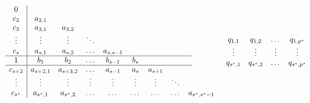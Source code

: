 \documentclass[../document.tex]{subfiles}
\begin{document}
                \begin{equation}
                    \begin{array}{c|ccccccccc}
                        0 & \multicolumn{9}{c}{}\\
                        c_2 & a_{2,1} & \multicolumn{8}{c}{}\\
                        c_3 & a_{3,1} & a_{3,2} & \multicolumn{7}{c}{}\\
                        \vdots & \vdots & \vdots & \ddots & \multicolumn{6}{c}{}\\
                        c_s & a_{s,1} & a_{s,2} & \dots & a_{s,s-1} & \multicolumn{5}{c}{}\\
                        \hline
                        1 & b_1 & b_2 & \dots & b_{s-1} & b_s & \multicolumn{4}{c}{}\\
                        \hline
                        c_{s+2} & a_{s+2,1} & a_{s+3,2} & \dots & a_{s-1} & a_{s} & a_{s + 1} & \multicolumn{3}{c}{}\\
                        \vdots & \vdots & \vdots & \vdots & \vdots & \vdots & \vdots & \ddots & \multicolumn{2}{c}{}\\
                        c_{s^{\star}} & a_{s^{\star},1} & a_{s^{\star},2} & \dots & \dots & \dots & \dots & \dots & a_{s^{\star},s^{\star}-1}
                    \end{array}\qquad\qquad
                    \begin{array}{cccc}
                        q_{1,1} & q_{1,2} & \dots & q_{1,p^{\star}}\\
                        \vdots & \vdots & \vdots & \vdots\\
                        q_{s^{\star},1} & q_{s^{\star},2} & \dots & q_{s^{\star},p^{\star}}\\
                    \end{array}
                \end{equation}
\end{document}
